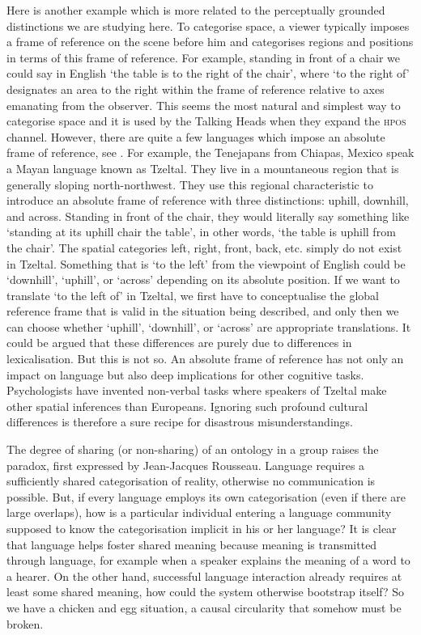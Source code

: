 Here is another example which is more related to 
the perceptually grounded distinctions we 
are studying here. To categorise space, a viewer 
typically imposes a frame of reference 
on the scene before him and categorises regions and positions in
terms of this frame of reference. For example, standing in front of
a chair we could say in English `the table is to the right of the chair', 
where `to the right of' designates an area to the right
within the frame 
of reference relative to axes emanating from the observer. This 
seems the most natural and simplest way to categorise space
and it is used by the Talking Heads when they expand the 
\textsc{hpos} channel. However, there are quite a few languages
which impose an absolute frame of reference, see \cite{Levinson:2006}. 
For example, the Tenejapans from Chiapas, Mexico 
speak a Mayan language known as
Tzeltal. They live in a mountaneous region that is generally 
sloping north-northwest. They use this regional characteristic
to introduce an absolute frame of reference with three distinctions: 
uphill, downhill, and across. Standing in front of the chair, they 
would literally say something like
`standing at its uphill chair the table', in other words, 
`the table is uphill from the chair'. 
The spatial categories left, right, front, back, etc. simply 
do not exist in Tzeltal.
Something that is `to the left' from the viewpoint
of English could be `downhill', `uphill', or `across' depending
on its absolute position. 
If we want to translate `to the left of' 
in Tzeltal, we first have to conceptualise the global reference
frame that is valid in the situation being described,  
and only then we can choose whether `uphill', `downhill', or `across'   
are appropriate translations. It could be argued that 
these differences are purely due to differences in 
lexicalisation. But this is not so. 
An absolute frame of reference
has not only an impact on language but also deep implications
for other cognitive tasks. Psychologists have invented 
non-verbal tasks where speakers of Tzeltal make other spatial
inferences than Europeans. Ignoring such profound 
cultural differences is therefore a sure recipe for
disastrous misunderstandings.

The degree of sharing (or non-sharing) of an 
ontology in a group raises the paradox, first 
expressed by Jean-Jacques Rousseau. Language requires a
sufficiently shared categorisation of reality, otherwise 
no communication is possible. But, if every language 
employs its own 
categorisation (even if there are large overlaps), how is a
particular individual entering a language community supposed to
know the categorisation implicit in his or her
language? It is clear that language 
helps foster shared meaning because meaning is transmitted 
through language, for example when a speaker explains the meaning
of a word to a hearer. On the other hand, successful 
language interaction already requires at least some shared
meaning, how could the system otherwise bootstrap itself?
So we have a chicken and egg situation, a causal 
circularity that somehow must be broken. 

